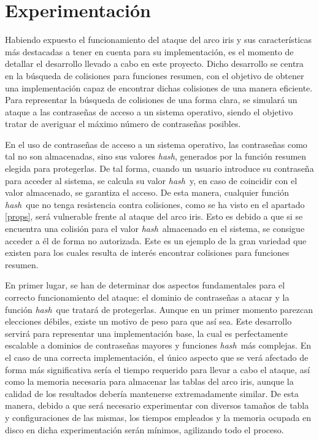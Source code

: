 \documentclass[12pt,spanish,listoffigures,listoftables,listofalgorithms]{tfgetsinf}
\newcommand{\hash}{\textit{hash}}
\begin{document}
\chapter{Experimentación}

Habiendo expuesto el funcionamiento del ataque del arco iris y sus características más destacadas a tener en cuenta para su implementación, es el momento de detallar el desarrollo llevado a cabo en este proyecto. Dicho desarrollo se centra en la búsqueda de colisiones para funciones resumen, con el objetivo de obtener una implementación capaz de encontrar dichas colisiones de una manera eficiente. Para representar la búsqueda de colisiones de una forma clara, se simulará un ataque a las contraseñas de acceso a un sistema operativo, siendo el objetivo tratar de averiguar el máximo número de contraseñas posibles.

En el uso de contraseñas de acceso a un sistema operativo, las contraseñas como tal no son almacenadas, sino sus valores \hash, generados por la función resumen elegida para protegerlas. De tal forma, cuando un usuario introduce su contraseña para acceder al sistema, se calcula su valor \hash~y, en caso de coincidir con el valor almacenado, se garantiza el acceso. De esta manera, cualquier función \hash~que no tenga resistencia contra colisiones, como se ha visto en el apartado \ref{props}, será vulnerable frente al ataque del arco iris. Esto es debido a que si se encuentra una colisión para el valor \hash~almacenado en el sistema, se consigue acceder a él de forma no autorizada. Este es un ejemplo de la gran variedad que existen para los cuales resulta de interés encontrar colisiones para funciones resumen.

En primer lugar, se han de determinar dos aspectos fundamentales para el correcto funcionamiento del ataque: el dominio de contraseñas a atacar y la función \hash~que tratará de protegerlas. Aunque en un primer momento parezcan elecciones débiles, existe un motivo de peso para que así sea. Este desarrollo servirá para representar una implementación base, la cual es perfectamente escalable a dominios de contraseñas mayores y funciones \hash~más complejas. En el caso de una correcta implementación, el único aspecto que se verá afectado de forma más significativa sería el tiempo requerido para llevar a cabo el ataque, así como la memoria necesaria para almacenar las tablas del arco iris, aunque la calidad de los resultados debería mantenerse extremadamente similar. De esta manera, debido a que será necesario experimentar con diversos tamaños de tabla y configuraciones de las mismas, los tiempos empleados y la memoria ocupada en disco en dicha experimentación serán mínimos, agilizando todo el proceso.
\end{document}
